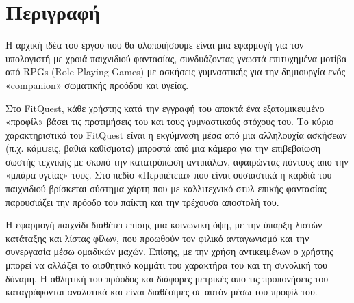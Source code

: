 \section{Περιγραφή}
  \newline\par
  Η αρχική ιδέα του έργου που θα υλοποιήσουμε είναι μια εφαρμογή για τον υπολογιστή με χροιά παιχνιδιού φαντασίας, συνδυάζοντας γνωστά επιτυχημένα μοτίβα από RPGs (Role Playing Games) με ασκήσεις γυμναστικής για την δημιουργία ενός «companion» σωματικής προόδου και υγείας.
  \newline\par
  Στο FitQuest, κάθε χρήστης κατά την εγγραφή του αποκτά ένα εξατομικευμένο «προφίλ» βάσει τις προτιμήσεις του και τους γυμναστικούς στόχους του. Το κύριο χαρακτηριστικό του FitQuest είναι η εκγύμναση μέσα από μια αλληλουχία ασκήσεων (π.χ. κάμψεις, βαθιά καθίσματα) μπροστά από μια κάμερα για την επιβεβαίωση σωστής τεχνικής με σκοπό την κατατρόπωση αντιπάλων, αφαιρώντας πόντους απο την «μπάρα υγείας» τους. Στο πεδίο «Περιπέτεια» που είναι ουσιαστικά η καρδιά του παιχνιδιού βρίσκεται σύστημα χάρτη που με καλλιτεχνικό στυλ επικής φαντασίας παρουσιάζει την πρόοδο του παίκτη και την τρέχουσα αποστολή του.
  \newline\par
  Η εφαρμογή-παιχνίδι διαθέτει επίσης μια κοινωνική όψη, με την ύπαρξη λιστών κατάταξης και λίστας φίλων, που προωθούν τον φιλικό ανταγωνισμό και την συνεργασία μέσω ομαδικών μαχών. Επίσης, με την χρήση αντικειμένων ο χρήστης μπορεί να αλλάξει το αισθητικό κομμάτι του χαρακτήρα του και τη συνολική του δύναμη. Η αθλητική του πρόοδος και διάφορες μετρικές απο τις προπονήσεις του καταγράφονται αναλυτικά και είναι διαθέσιμες σε αυτόν μέσω του προφίλ του. 

